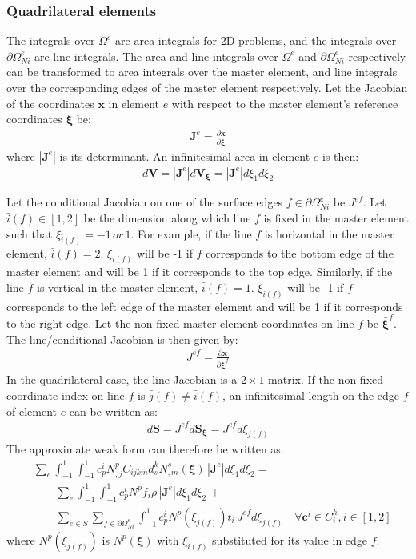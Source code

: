 	\subsubsection{Quadrilateral elements}
	The integrals over $\Omega^e$ are area integrals for 2D problems, and the integrals over $\partial \Omega^e_{Ni}$ are line integrals. The area and line integrals over $\Omega^e$ and $\partial \Omega^e_{Ni}$ respectively can be transformed to area integrals over the master element, and line integrals over the corresponding edges of the master element respectively. Let the Jacobian of the coordinates $\bm{x}$ in element $e$ with respect to the master element's reference coordinates $\bm{\xi}$ be:
	\begin{align}
	    \bm{J}^e = \frac{\partial \bm{x}}{\partial \bm{\xi}}
	\end{align}
	where $|\bm{J}^e|$ is its determinant. An infinitesimal area in element $e$ is then:
	\begin{align}
	    d\bm{V} = |\bm{J}^e|d\bm{V_\xi} = |\bm{J}^e|d\xi_1 d\xi_2
	\end{align}
	
	Let the conditional Jacobian on one of the surface edges $f \in \partial \Omega^e_{Ni}$ be $J^{ef}$. Let $\bar{i}(f) \in [1,2]$ be the dimension along which line $f$ is fixed in the master element such that $\xi_{\bar{i}(f)} = -1 \, or \, 1$. For example, if the line $f$ is horizontal in the master element, $\bar{i}(f) = 2$. $\xi_{\bar{i}(f)}$ will be -1 if $f$ corresponds to the bottom edge of the master element and will be 1 if it corresponds to the top edge. Similarly, if the line $f$ is vertical in the master element, $\bar{i}(f) = 1$. $\xi_{\bar{i}(f)}$ will be -1 if $f$ corresponds to the left edge of the master element and will be 1 if it corresponds to the right edge. Let the non-fixed master element coordinates on line $f$ be $\bar{\bm{\xi}}^f$. The line/conditional Jacobian is then given by:
	\begin{align}
	    J^{ef} = \frac{\partial \bm{x}}{\partial \bar{\bm{\xi}}^f}
	\end{align}
	In the quadrilateral case, the line Jacobian is a $2 \times 1$ matrix. If the non-fixed coordinate index on line $f$ is $\bar{j}(f) \neq \bar{i}(f)$, an infinitesimal length on the edge $f$ of element $e$ can be written as:
	\begin{align}
	    d\bm{S} = J^{ef} d\bm{S_{\xi}} = J^{ef} d\xi_{\bar{j}(f)}
	\end{align}
	The approximate weak form can therefore be written as:
	\begin{align}
		& \sum_e \int_{-1}^1 \int_{-1}^1 c^i_pN^p_{,j}C_{ijkm}d^k_sN^s_{,m}(\bm{\xi}) \,|\bm{J}^e|d\xi_1 d\xi_2 = \nonumber \\
		& \qquad \sum_e \int_{-1}^1 \int_{-1}^1 c^i_pN^p f_i \rho\,|\bm{J}^e|d\xi_1 d\xi_2 \, + \nonumber \\
		& \qquad \sum_{e \in S} \sum_{f \in \partial \Omega^e_{Ni}}\int_{-1}^1 c^i_pN^p(\xi_{\bar{j}(f)}) t_i \,J^{ef} d\xi_{\bar{j}(f)} \quad \forall \bm{c}^i \in C^h_i, i \in [1,2]
	\end{align}
	where $N^p(\xi_{\bar{j}(f)})$ is $N^p(\bm{\xi})$ with $\xi_{\bar{i}(f)}$ substituted for its value in edge $f$.

